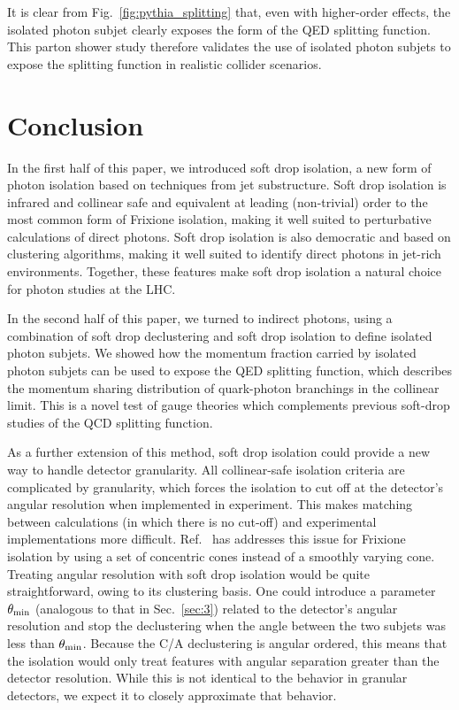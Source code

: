 \documentclass[a4paper,11pt]{article}
\DeclareRobustCommand{\Sec}[1]{Sec.~\ref{#1}}
\DeclareRobustCommand{\Fig}[1]{Fig.~\ref{#1}}
\DeclareRobustCommand{\Ref}[1]{Ref.~\cite{#1}}
\begin{document}
It is clear from \Fig{fig:pythia_splitting} that, even with higher-order effects, the isolated photon subjet clearly exposes the form of the QED splitting function.
%
This parton shower study therefore validates the use of isolated photon subjets to expose the splitting function in realistic collider scenarios.

\section{Conclusion}
\label{sec:conclusion}

In the first half of this paper, we introduced soft drop isolation, a new form of photon isolation based on techniques from jet substructure.
%
Soft drop isolation is infrared and collinear safe and equivalent at leading (non-trivial) order to the most common form of Frixione isolation, making it well suited to perturbative calculations of direct photons.
%
Soft drop isolation is also democratic and based on clustering algorithms, making it well suited to identify direct photons in jet-rich environments.
%
Together, these features make soft drop isolation a natural choice for photon studies at the LHC.

In the second half of this paper, we turned to indirect photons, using a combination of soft drop declustering and soft drop isolation to define isolated photon subjets.
% 
We showed how the momentum fraction carried by isolated photon subjets can be used to expose the QED splitting function, which describes the momentum sharing distribution of quark-photon branchings in the collinear limit.
%
This is a novel test of gauge theories which complements previous soft-drop studies of the QCD splitting function.

As a further extension of this method, soft drop isolation could provide a new way to handle detector granularity.
%
All collinear-safe isolation criteria are complicated by granularity, which forces the isolation to cut off at the detector's angular resolution when implemented in experiment.
%
This makes matching between calculations (in which there is no cut-off) and experimental implementations more difficult.
%
\Ref{Binoth:2010nha} has addresses this issue for Frixione isolation by using a set of concentric cones instead of a smoothly varying cone.
%
Treating angular resolution with soft drop isolation would be quite straightforward, owing to its clustering basis.
%
One could introduce a parameter $\theta_{\rm min}$ (analogous to that in \Sec{sec:3}) related to the detector's angular resolution and stop the declustering when the angle between the two subjets was less than $\theta_{\rm min}$.
%
Because the C/A declustering is angular ordered, this means that the isolation would only treat features with angular separation greater than the detector resolution.
%
While this is not identical to the behavior in granular detectors, we expect it to closely approximate that behavior.
\end{document}
